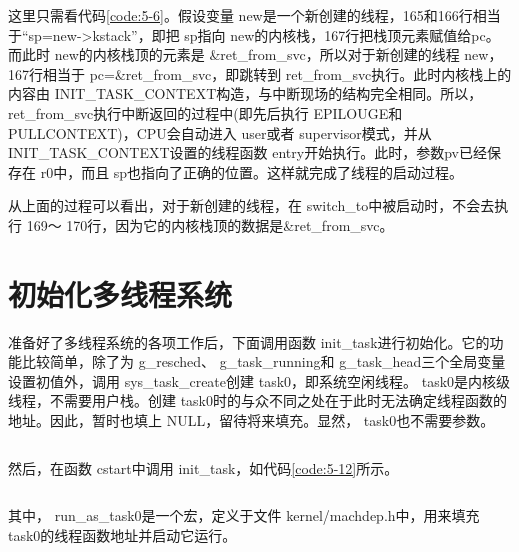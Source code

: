 \documentclass[main.tex]{subfiles}
\begin{document}
\begin{CJK*}{UTF8}{song}
\par
这里只需看代码\ref{code:5-6}。假设变量 new是一个新创建的线程，165和166行相当于“sp=new-\textgreater kstack”，即把 sp指向 new的内核栈，167行把栈顶元素赋值给pc。而此时 new的内核栈顶的元素是  \&ret\_\-from\_\-svc，所以对于新创建的线程 new，167行相当于 pc=\&ret\_\-from\_\-svc，即跳转到 ret\_\-from\_\-svc执行。此时内核栈上的内容由  INIT\_\-TASK\_\-CONTEXT构造，与中断现场的结构完全相同。所以，  ret\_\-from\_\-svc执行中断返回的过程中(即先后执行 EPILOUGE和  PULL\-CONTEXT)，CPU会自动进入 user或者 supervisor模式，并从  INIT\_\-TASK\_\-CONTEXT设置的线程函数  entry开始执行。此时，参数pv已经保存在 r0中，而且 sp也指向了正确的位置。这样就完成了线程的启动过程。

\par
从上面的过程可以看出，对于新创建的线程，在 switch\_\-to中被启动时，不会去执行 169～ 170行，因为它的内核栈顶的数据是\&ret\_\-from\_\-svc。

\section{初始化多线程系统}
准备好了多线程系统的各项工作后，下面调用函数 init\_\-task进行初始化。它的功能比较简单，除了为 g\_\-resched、 g\_\-task\_\-running和 g\_\-task\_\-head三个全局变量设置初值外，调用 sys\_\-task\_\-create创建 task0，即系统空闲线程。 task0是内核级线程，不需要用户栈。创建 task0时的与众不同之处在于此时无法确定线程函数的地址。因此，暂时也填上 NULL，留待将来填充。显然， task0也不需要参数。

\begin{code}
\label{code:5-11}
\inputminted[firstline=290,lastline=306,linenos,numbersep=5pt,frame=lines,framesep=2mm]{c}{src/chapter05/kernel/task.c}
\end{code}

\noindent
然后，在函数 cstart中调用 init\_\-task，如代码\ref{code:5-12}所示。

\begin{code}
\label{code:5-12}
\inputminted[firstline=491,lastline=502,linenos,numbersep=5pt,frame=lines,framesep=2mm]{c}{src/chapter05/kernel/machdep.c}
\end{code}

\noindent
其中， run\_\-as\_\-task0是一个宏，定义于文件 kernel\-/\-machdep.h中，用来填充 task0的线程函数地址并启动它运行。

\begin{code}
\label{code:5-13}
\inputminted[firstline=76,lastline=89,linenos,numbersep=5pt,frame=lines,framesep=2mm]{c}{src/chapter05/kernel/machdep.h}
\end{code}


\end{CJK*}
\end{document}
